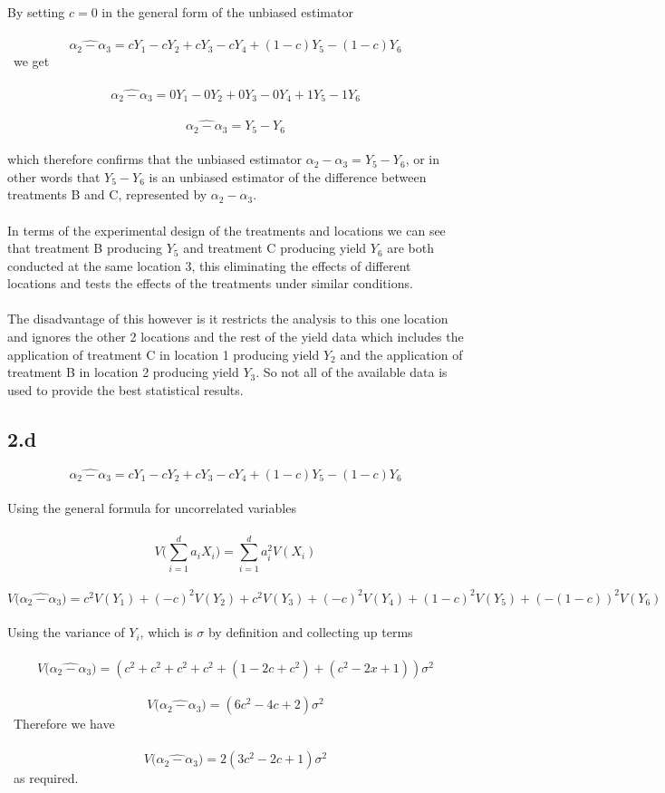 \documentclass[11pt]{article}   	%
\begin{document}
By setting $ c = 0 $ in the general form of the unbiased estimator \\
\\
\[ \widehat{ \alpha_2 - \alpha_3 } = cY_1 - cY_2 +cY_3 - cY_4 + (1 - c)Y_5 - (1 - c)Y_6 \]
\
we get \\
\
\[ \widehat{ \alpha_2 - \alpha_3 } = 0Y_1 - 0Y_2 + 0Y_3 - 0Y_4  + 1 Y_5 - 1 Y_6 \]
\
\[ \widehat{ \alpha_2 - \alpha_3 } = Y_5 - Y_6 \]
\\
which therefore confirms that the unbiased estimator $ \widehat{ \alpha_2 - \alpha_3 } = Y_5 - Y_6 $, or in other words that $ Y_5 - Y_6 $ is an unbiased estimator of the difference between treatments B and C, represented by $ \alpha_2 - \alpha_3 $. \\
\\
In terms of the experimental design of the treatments and locations we can see that treatment B producing $ Y_5 $ and treatment C producing yield $ Y_6 $ are both conducted at the same location 3, this eliminating the effects of different locations and tests the effects of the treatments under similar conditions. \\
\\
The disadvantage of this however is it restricts the analysis to this one location and ignores the other 2 locations and the rest of the yield data which includes the application of treatment C in location 1 producing yield $ Y_2 $ and the application of treatment B in location 2 producing yield $ Y_3 $. So not all of the available data is used to provide the best statistical results. \\

\subsection*{2.d}

\[ \widehat{ \alpha_2 - \alpha_3 } = cY_1 - cY_2 +cY_3 - cY_4 + (1 - c)Y_5 - (1 - c)Y_6 \]
\\
Using the general formula for uncorrelated variables \\
\
\[ V \big( \sum_{i=1}^{d} a_i X_i \big) = \sum_{i=1}^d a_i^2 V (X_i) \]
\\
\[ V \big( \widehat{ \alpha_2 - \alpha_3 } \big) = c^2 V(Y_1) + (-c)^2 V(Y_2) + c^2 V(Y_3) + (-c)^2 V(Y_4) + (1 - c)^2 V(Y_5) +( -(1 - c))^2 V(Y_6) \]
\\
Using the variance of $ Y_i $, which is $ \sigma $ by definition and collecting up terms \\
\
\[ V \big( \widehat{ \alpha_2 - \alpha_3 } \big) = (c^2 + c^2 + c^2 + c^2 + (1 - 2c + c^2) + (c^2 -2x + 1) ) \sigma^2 \]
\
\[ V \big( \widehat{ \alpha_2 - \alpha_3 } \big) = (6 c^2 - 4c + 2) \sigma^2 \]
\
Therefore we have \\
\
\[ V \big( \widehat{ \alpha_2 - \alpha_3 } \big) = 2(3c^2 - 2c + 1) \sigma^2 \]
\
as required.
\end{document}
